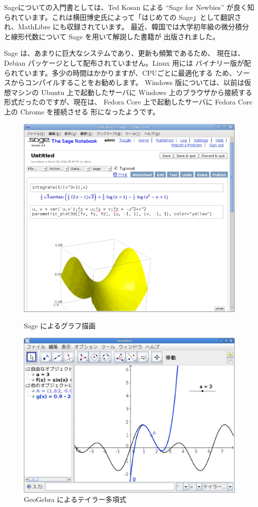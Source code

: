 \documentclass[mingoth,a4paper]{jsarticle}
\begin{document}
Sageについての入門書としては、Ted Kosan による ``Sage for Newbies''
\cite{newbie} が良く知られています。これは横田博史氏によって「はじめての
Sage」\cite{ponpoko}として翻訳され、MathLibre にも収録されています。
最近、韓国では大学初年級の微分積分と線形代数について Sage を用いて解説した書籍が
出版されました。

Sage は、あまりに巨大なシステムであり、更新も頻繁であるため、
現在は、Debian パッケージとして配布されていません。Linux 用には
バイナリー版が配られています。多少の時間はかかりますが、CPUごとに最適化する
ため、ソースからコンパイルすることをお勧めします。
Windows 版については、以前は仮想マシンの Ubuntu 上で起動したサーバに
Windows 上のブラウザから接続する形式だったのですが、現在は、
Fedora Core 上で起動したサーバに Fedora Core 上の Chrome を接続させる
形になったようです。

\begin{figure}[ht]
\begin{minipage}[c]{0.45\hsize}
\includegraphics[height=0.8\hsize]{image2012-gum/sage.eps}
\caption{Sage によるグラフ描画}
\label{fig:sage}
\end{minipage}
\begin{minipage}[c]{0.48\hsize}
\includegraphics[height=0.72\hsize]{image2012-gum/taylor.eps}
\caption{GeoGebra によるテイラー多項式}
\label{fig:geogebra}
\end{minipage}
\end{figure}
\end{document}
